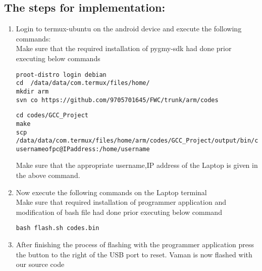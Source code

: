 \documentclass[10pt, a4paper]{article}
\begin{document}
\subsection{The steps for implementation:}
\begin{enumerate}
\item Login to termux-ubuntu on the android device and execute the following commands:\\
Make sure that the required installation of pygmy-sdk had done prior executing below commands
\begin{lstlisting}
proot-distro login debian
cd  /data/data/com.termux/files/home/
mkdir arm
svn co https://github.com/9705701645/FWC/trunk/arm/codes
\end{lstlisting}
\begin{lstlisting}
cd codes/GCC_Project
make
scp /data/data/com.termux/files/home/arm/codes/GCC_Project/output/bin/codes.bin usernameofpc@IPaddress:/home/username
\end{lstlisting}
Make sure that the appropriate username,IP address of the Laptop is given in the above command.
\item Now execute the following commands on the Laptop terminal\\
Make sure that required installation of programmer application and modification of bash file had done prior executing below command
\begin{lstlisting}
bash flash.sh codes.bin
\end{lstlisting}
\item After finishing the process of flashing with the programmer application press the button to the right of the USB port to reset. Vaman is now flashed with our source code
\end{enumerate}
\end{document}
